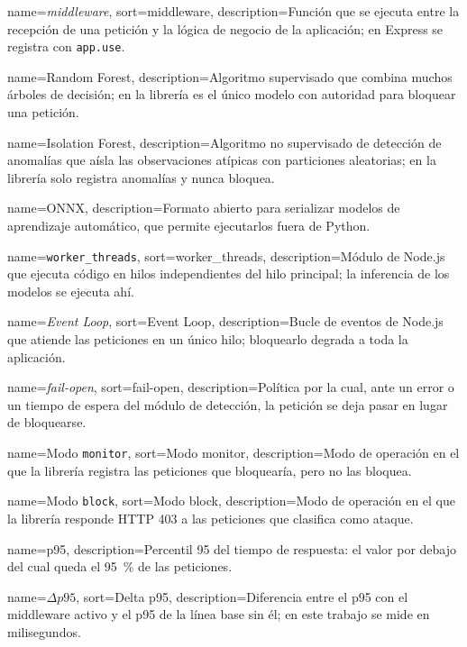 {
    name={\textit{middleware}},
    sort={middleware},
    description={Función que se ejecuta entre la recepción de una petición y la lógica de negocio de la aplicación; en Express se registra con \texttt{app.use}.}
}

{
    name={Random Forest},
    description={Algoritmo supervisado que combina muchos árboles de decisión; en la librería es el único modelo con autoridad para bloquear una petición.}
}

{
    name={Isolation Forest},
    description={Algoritmo no supervisado de detección de anomalías que aísla las observaciones atípicas con particiones aleatorias; en la librería solo registra anomalías y nunca bloquea.}
}

{
    name={ONNX},
    description={Formato abierto para serializar modelos de aprendizaje automático, que permite ejecutarlos fuera de Python.}
}

{
    name={\texttt{worker\_threads}},
    sort={worker_threads},
    description={Módulo de Node.js que ejecuta código en hilos independientes del hilo principal; la inferencia de los modelos se ejecuta ahí.}
}

{
    name={\textit{Event Loop}},
    sort={Event Loop},
    description={Bucle de eventos de Node.js que atiende las peticiones en un único hilo; bloquearlo degrada a toda la aplicación.}
}

{
    name={\textit{fail-open}},
    sort={fail-open},
    description={Política por la cual, ante un error o un tiempo de espera del módulo de detección, la petición se deja pasar en lugar de bloquearse.}
}

{
    name={Modo \texttt{monitor}},
    sort={Modo monitor},
    description={Modo de operación en el que la librería registra las peticiones que bloquearía, pero no las bloquea.}
}

{
    name={Modo \texttt{block}},
    sort={Modo block},
    description={Modo de operación en el que la librería responde HTTP 403 a las peticiones que clasifica como ataque.}
}

{
    name={p95},
    description={Percentil 95 del tiempo de respuesta: el valor por debajo del cual queda el 95~\% de las peticiones.}
}

{
    name={$\Delta p95$},
    sort={Delta p95},
    description={Diferencia entre el p95 con el middleware activo y el p95 de la línea base sin él; en este trabajo se mide en milisegundos.}
}


